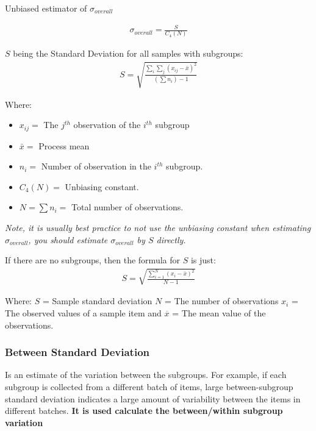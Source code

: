 \documentclass[11pt]{article}
\begin{document}
Unbiased estimator of \(\sigma_{overall}\)

\begin{gather}
  \sigma_{overall}= \frac{S}{C_4(N)}
\end{gather}

\(S\) being the Standard Deviation for all samples with subgroups:
\begin{gather}
  S = \sqrt{\frac{\sum_i \sum_j (x_{ij} - \bar{x})^2}{(\sum n_i) - 1}}
\end{gather}

Where: 
\begin{itemize}
  \item \(x_{ij} = \) The \(j^{th}\) observation of the \(i^{th}\) subgroup 
  \item  \(\bar x =\) Process mean 
  \item \(n_i = \) Number of observation in the \(i^{th}\) subgroup.
  \item \(C_4(N) = \) Unbiasing constant. 
  \item \(N = \sum n_i =\) Total number of observations.
\end{itemize}


\emph{Note, it is usually best practice to not use the unbiasing
constant when estimating \(\sigma_{overall}\), you should estimate
\(\sigma_{overall}\) by \(S\) directly.}

If there are no subgroups, then the formula for \(S\) is just:
\begin{gather}
  S = \sqrt{\frac{\sum^N_{i=1} (x_i - \bar x)^2}{N-1}}
\end{gather}

Where: \(S\) = Sample standard deviation \(N\) = The number of
observations \(x_i\) = The observed values of a sample item and
\(\overline {x}\) = The mean value of the observations.

\hypertarget{between-standard-deviation}{%
\subsubsection{Between Standard
Deviation}\label{between-standard-deviation}}

Is an estimate of the variation between the subgroups. For example, if
each subgroup is collected from a different batch of items, large
between-subgroup standard deviation indicates a large amount of
variability between the items in different batches. \textbf{It is used
calculate the between/within subgroup variation}
\end{document}
